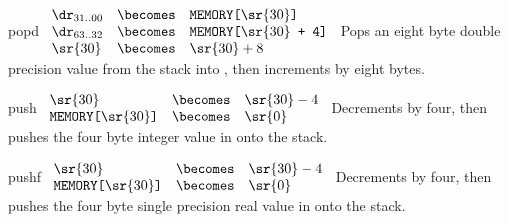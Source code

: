\begin{instruction}{popd}\label{inst:popd}
     {\popdopc}
     {
       \begin{math}
         \begin{array}{lcl}
           {\dr}_{31..00} & \becomes & \texttt{MEMORY[\textrm{\sr{30}}]} \\
           {\dr}_{63..32} & \becomes & \texttt{MEMORY[\textrm{\sr{30}} + 4]} \\
           \sr{30}       & \becomes & \sr{30} + 8 \\
         \end{array}
       \end{math}
     }
     {
       Pops an eight byte double precision  value from the stack
       into \dr, then increments  by eight bytes.
     }
\end{instruction}

\begin{instruction}{push}\label{inst:push}
     {\pushopc}
     {
       \begin{math}
         \begin{array}{lcl}
           \sr{30}                           & \becomes & \sr{30} - 4 \\
           \texttt{MEMORY[\textrm{\sr{30}}]} & \becomes & {\sr{0}} \\
         \end{array}
       \end{math}
     }
     {
       Decrements  by four, then pushes the four byte integer
       value in  onto the stack.
     }
\end{instruction}

\begin{instruction}{pushf}\label{inst:pushf}
     {\pushfopc}
     {
       \begin{math}
         \begin{array}{lcl}
           \sr{30}                           & \becomes & \sr{30} - 4 \\
           \texttt{MEMORY[\textrm{\sr{30}}]} & \becomes & {\sr{0}} \\
         \end{array}
       \end{math}
     }
     {
       Decrements  by four, then pushes the four byte single
       precision real value in  onto the stack.
     }
\end{instruction}

